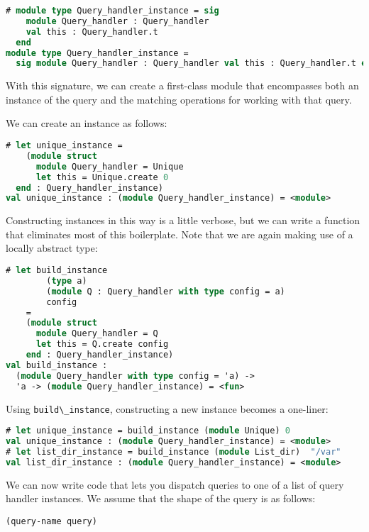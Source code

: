 \begin{lstlisting}[language=Caml]
# module type Query_handler_instance = sig
    module Query_handler : Query_handler
    val this : Query_handler.t
  end
module type Query_handler_instance =
  sig module Query_handler : Query_handler val this : Query_handler.t end
\end{lstlisting}

With this signature, we can create a first-class module that encompasses
both an instance of the query and the matching operations for working
with that query.

We can create an instance as follows:

\begin{lstlisting}[language=Caml]
# let unique_instance =
    (module struct
      module Query_handler = Unique
      let this = Unique.create 0
  end : Query_handler_instance)
val unique_instance : (module Query_handler_instance) = <module>
\end{lstlisting}

Constructing instances in this way is a little verbose, but we can write
a function that eliminates most of this boilerplate. Note that we are
again making use of a locally abstract type:

\begin{lstlisting}[language=Caml]
# let build_instance
        (type a)
        (module Q : Query_handler with type config = a)
        config
    =
    (module struct
      module Query_handler = Q
      let this = Q.create config
    end : Query_handler_instance)
val build_instance :
  (module Query_handler with type config = 'a) ->
  'a -> (module Query_handler_instance) = <fun>
\end{lstlisting}

Using \passthrough{\lstinline!build\_instance!}, constructing a new
instance becomes a one-liner:

\begin{lstlisting}[language=Caml]
# let unique_instance = build_instance (module Unique) 0
val unique_instance : (module Query_handler_instance) = <module>
# let list_dir_instance = build_instance (module List_dir)  "/var"
val list_dir_instance : (module Query_handler_instance) = <module>
\end{lstlisting}

We can now write code that lets you dispatch queries to one of a list of
query handler instances. We assume that the shape of the query is as
follows:

\begin{lstlisting}
(query-name query)
\end{lstlisting}

